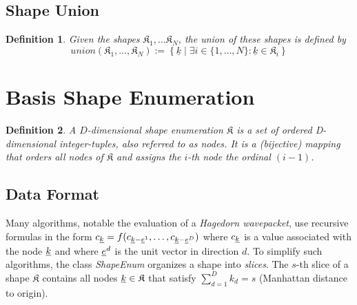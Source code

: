 \documentclass{article}
\def\classname#1{\textit{#1}}
\newtheorem*{definition}{Definition}
\begin{document}
\subsection{Shape Union}

\begin{definition}
  Given the shapes \( \mathfrak{K}_1, \ldots \mathfrak{K}_N \),
  the union of these shapes is defined by
  \begin{equation}
    union(\mathfrak{K}_1,\ldots,\mathfrak{K}_N) := \left\{ 
      \underline{k} \mid \exists i \in \{1, \ldots, N \} \colon \underline{k} \in \mathfrak{K}_i\right\}
  \end{equation}
\end{definition}

\section{Basis Shape Enumeration}



\begin{definition}
  A \( D \)-dimensional
  shape enumeration \( \mathfrak{K} \)
  is a set of ordered D-dimensional integer-tuples, also referred to
  as \emph{nodes}. It is a (bijective) mapping that orders all nodes
  of \( \mathfrak{K} \)
  and assigns the \(i\)-th node the ordinal \( (i-1) \).
\end{definition}

\subsection{Data Format}
Many algorithms, notable the evaluation of a \emph{Hagedorn wavepacket},
use recursive formulas in the form
\( c_{\underline{k}} = f(c_{\underline{k}-\underline{e}^1}, \ldots,
c_{\underline{k}-\underline{e}^D}) \)
where \( c_{\underline{k}} \)
is a value associated with the node \( \underline{k} \)
and where \( \underline{e}^d \)
is the unit vector in direction \( d \).
To simplify such algorithms, the class \classname{ShapeEnum} organizes a shape
into \emph{slices}.  The \( s \)-th
slice of a shape \( \mathfrak{K} \)
contains all nodes \( \underline{k} \in \mathfrak{K} \)
that satisfy \( \sum_{d=1}^{D} k_d = s \) (Manhattan distance to origin).
\end{document}

